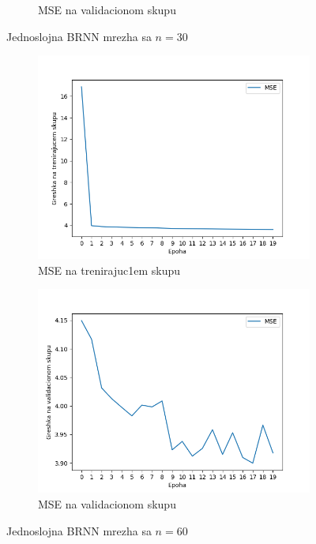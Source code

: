 \documentclass[a4paper, openany, oneside, 11pt]{book}
\begin{document}
\begin{figure}[!h]
\begin{subfigure}{0.475\textwidth}
            \caption{\acrshort{MSE} na validacionom skupu}
            \label{fig:4_6b}
            \vspace{0pt}
        \end{subfigure}
        \caption{Jednoslojna \acrshort{BRNN} mrezha sa $n=30$}
        \label{fig:4_6}
\end{figure}
\begin{figure}[!h]
        \centering
        \begin{subfigure}{0.475\textwidth}
            \centering
            \includegraphics[scale=0.45]{res/BidirectSingleLayerLSTM_60units_train.png}
            \caption{\acrshort{MSE} na trenirajuc1em skupu}
            \label{fig:4_7a}
            \vspace{0pt}
        \end{subfigure}%
        \begin{subfigure}{0.475\textwidth}
            \centering
            \includegraphics[scale=0.45]{res/BidirectSingleLayerLSTM_60units_validation.png}
            \caption{\acrshort{MSE} na validacionom skupu}
            \label{fig:4_7b}
            \vspace{0pt}
        \end{subfigure}
        \caption{Jednoslojna \acrshort{BRNN} mrezha sa $n=60$}
        \label{fig:4_7}
\end{figure}
\end{document}
